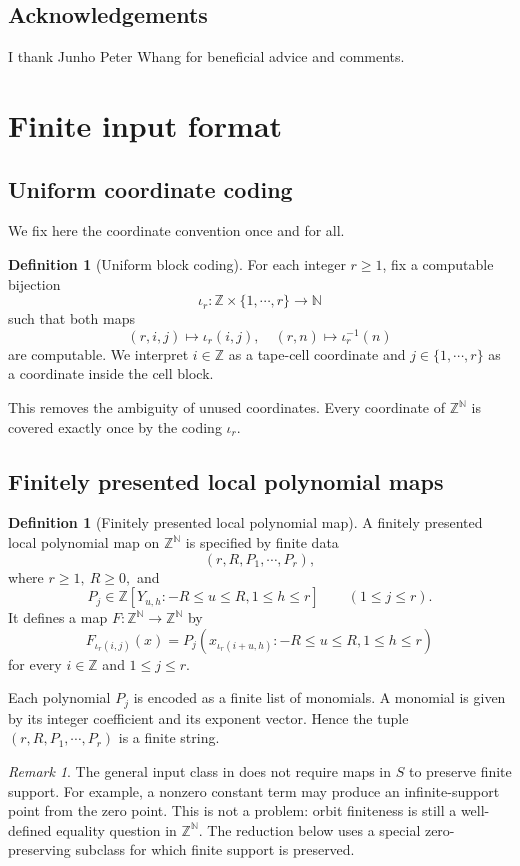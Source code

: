 \documentclass{amsart}
\theoremstyle{definition}
\newtheorem{definition}[theorem]{Definition}
\theoremstyle{remark}
\newtheorem{remark}[theorem]{Remark}
\numberwithin{equation}{section}
\newcommand{\Z}{\mathbb{Z}}
\newcommand{\N}{\mathbb{N}}
\begin{document}
\subsection{Acknowledgements}
I thank Junho Peter Whang for beneficial advice and comments.

\section{Finite input format}

\subsection{Uniform coordinate coding}
We fix here the coordinate convention once and for all.
\begin{definition}[Uniform block coding]
For each integer $r\ge1$, fix a computable bijection
\[
\iota_r:\Z\times\{1,\cdots,r\}\to\N
\]
such that both maps
\[
(r,i,j)\mapsto\iota_r(i,j),\quad(r,n)\mapsto\iota_r^{-1}(n)
\]
are computable.
We interpret $i\in\Z$ as a tape-cell coordinate and $j\in\{1,\cdots,r\}$ as a coordinate inside the cell block.
\end{definition}
This removes the ambiguity of unused coordinates.
Every coordinate of $\Z^\N$ is covered exactly once by the coding $\iota_r$.

\subsection{Finitely presented local polynomial maps}
\begin{definition}[Finitely presented local polynomial map]
A finitely presented local polynomial map on $\Z^\N$ is specified by finite data
\[(r,R,P_1,\cdots,P_r),\]
where $r\ge1,\ R\ge0,$ and
\[P_j\in\Z[Y_{u,h}:-R\le u\le R,1\le h\le r]\qquad(1\le j\le r).\]
It defines a map $F:\Z^\N\to\Z^\N$ by
\[
F_{\iota_r(i,j)}(x)=P_j(x_{\iota_r(i+u,h)}:-R\le u\le R,1\le h\le r)
\]
for every $i\in\Z$ and $1\le j\le r$.
\end{definition}
Each polynomial $P_j$ is encoded as a finite list of monomials.
A monomial is given by its integer coefficient and its exponent vector.
Hence the tuple $(r,R,P_1,\cdots,P_r)$ is a finite string.

\begin{remark}
The general input class in  does not require maps in $S$ to preserve finite support.
For example, a nonzero constant term may produce an infinite-support point from the zero point.
This is not a problem: orbit finiteness is still a well-defined equality question in $\Z^\N$.
The reduction below uses a special zero-preserving subclass for which finite support is preserved.
\end{remark}
\end{document}
